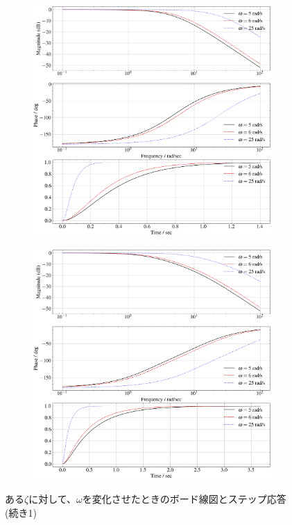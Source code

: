 \begin{figure}
	\centering
	\begin{subfigure}{0.8\linewidth}
		\setcounter{subfigure}{2}
		\centering
		\includegraphics[width=0.8\linewidth]{src/figures/bode-phase-step-ideal-group-zeta/bode-phase-step-ideal-group-zeta-1.0.png}
		\label{fig:bode-phase-step-ideal-group-zeta-1.0}
	\end{subfigure}
	\begin{subfigure}{0.8\linewidth}
		\centering
		\includegraphics[width=0.8\linewidth]{src/figures/bode-phase-step-ideal-group-zeta/bode-phase-step-ideal-group-zeta-1.5.png}
		\label{fig:bode-phase-step-ideal-group-zeta-1.5}
	\end{subfigure}
	\caption{ある$\zeta$に対して、$\omega$を変化させたときのボード線図とステップ応答(続き1)}
\end{figure}

